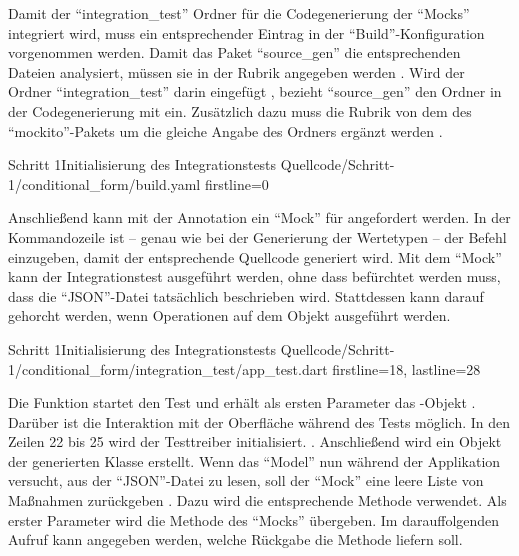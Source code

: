 Damit der \enquote{integration_test} Ordner für die Codegenerierung der \enquote{Mocks} integriert wird, muss ein entsprechender Eintrag in der \enquote{Build}-Konfiguration vorgenommen werden.
Damit das Paket \enquote{source_gen} die entsprechenden Dateien analysiert, müssen sie in der Rubrik  angegeben werden .
Wird der Ordner \enquote{integration_test} darin eingefügt , bezieht \enquote{source_gen} den Ordner in der Codegenerierung mit ein.
Zusätzlich dazu muss die Rubrik  von dem  des \enquote{mockito}-Pakets  um die gleiche Angabe des Ordners ergänzt werden .

\begin{alexyamllisting}{Schritt 1}{Initialisierung des Integrationstests}
  {Quellcode/Schritt-1/conditional_form/build.yaml}
  {firstline=0}
  \label{lst:Schritt1IntegrationsTestInitialisierung}
\end{alexyamllisting}

Anschließend kann mit der Annotation   ein \enquote{Mock} für  angefordert werden.
In der Kommandozeile ist -- genau wie bei der Generierung der Wertetypen -- der Befehl  einzugeben, damit der entsprechende Quellcode generiert wird. 
Mit dem \enquote{Mock} kann der Integrationstest ausgeführt werden, ohne dass befürchtet werden muss, dass die \enquote{JSON}-Datei tatsächlich beschrieben wird.
Stattdessen kann darauf gehorcht werden, wenn Operationen auf dem Objekt ausgeführt werden. 

\begin{alexlisting}{Schritt 1}{Initialisierung des Integrationstests}
  {Quellcode/Schritt-1/conditional_form/integration_test/app_test.dart}
  {firstline=18, lastline=28}
  \label{lst:Schritt1IntegrationsTestInitialisierung}
\end{alexlisting}

Die Funktion  startet den Test und erhält als ersten Parameter das -Objekt .
Darüber ist die Interaktion mit der Oberfläche während des Tests möglich.
In den Zeilen 22 bis 25 wird der Testtreiber initialisiert. .
Anschließend wird ein Objekt der generierten Klasse  erstellt.
Wenn das \enquote{Model} nun während der Applikation versucht, aus der \enquote{JSON}-Datei zu lesen, soll der \enquote{Mock} eine leere Liste von Maßnahmen zurückgeben .
Dazu wird die entsprechende Methode  verwendet.
Als erster Parameter wird die Methode  des \enquote{Mocks} übergeben.
Im darauffolgenden Aufruf  kann angegeben werden, welche Rückgabe die Methode liefern soll.


